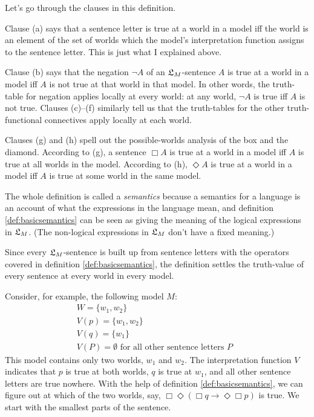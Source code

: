 Let's go through the clauses in this definition.

Clause (a) says that a sentence letter is true at a world in a model iff the
world is an element of the set of worlds which the model's interpretation
function assigns to the sentence letter. This is just what I explained above.

Clause (b) says that the negation $\neg A$ of an $\mathfrak{L}_M$-sentence $A$ is true at
a world in a model iff $A$ is not true at that world in that model. In other
words, the truth-table for negation applies locally at every world: at any
world, $\neg A$ is true iff $A$ is not true.
Clauses (c)--(f) similarly tell us that the truth-tables for the other
truth-functional connectives apply locally at each world.

Clauses (g) and (h) spell out the possible-worlds analysis of the box and the
diamond. According to (g), a sentence $\Box A$ is true at a world in a model iff
$A$ is true at all worlds in the model. According to (h), $\Diamond A$ is true
at a world in a model iff $A$ is true at some world in the same model.

The whole definition is called a \emph{semantics} because a semantics for a
language is an account of what the expressions in the language mean, and
definition \ref{def:basicsemantics} can be seen as giving the meaning of the
logical expressions in $\mathfrak{L}_M$. (The non-logical expressions in $\mathfrak{L}_{M}$ don't
have a fixed meaning.)

Since every $\mathfrak{L}_M$-sentence is built up from sentence letters with the operators
covered in definition \ref{def:basicsemantics}, the definition settles the
truth-value of every sentence at every world in every model.

Consider, for example, the following model $M$:
%
\begin{gather*}
  W = \{ w_{1},w_{2} \}\\
  V(p) = \{ w_{1},w_{2} \}\\
  V(q) = \{ w_{1} \}\\
  V(P) = \emptyset \text{ for all other sentence letters $P$ }
\end{gather*}
This model contains only two worlds, $w_{1}$ and $w_{2}$. The interpretation
function $V$ indicates that $p$ is true at both worlds, $q$ is true at $w_{1}$,
and all other sentence letters are true nowhere. With the help of definition
\ref{def:basicsemantics}, we can figure out at which of the two worlds, say,
$\Box\Diamond(\Box q \to \Diamond\Box p)$ is true. We start with the smallest
parts of the sentence.

